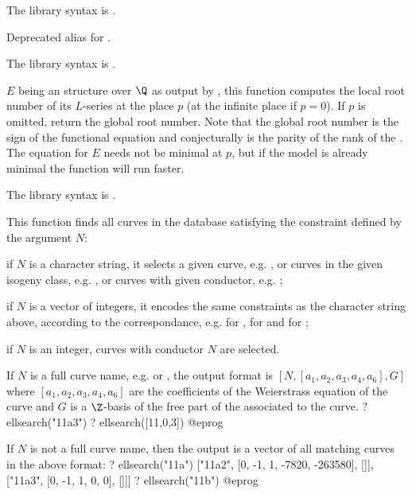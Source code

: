 The library syntax is .

\label{se:ellpow}
Deprecated alias for .

The library syntax is .

\label{se:ellrootno}
$E$ being an  structure over $\Q$ as output by ,
this function computes the local root number of its $L$-series at the place
$p$ (at the infinite place if $p = 0$). If $p$ is omitted, return the global
root number. Note that the global root number is the sign of the functional
equation and conjecturally is the parity of the rank of the . The equation for $E$ needs not be minimal at $p$, but if the model
is already minimal the function will run faster.

The library syntax is .

\label{se:ellsearch}
This function finds all curves in the  database satisfying
the constraint defined by the argument $N$:

\item if $N$ is a character string, it selects a given curve, e.g.
, or curves in the given isogeny class, e.g. , or
curves with given conductor, e.g. ;

\item if $N$ is a vector of integers, it encodes the same constraints
as the character string above, according to the 
correspondance, e.g. \kbd{[11,0,1]} for , \kbd{[11,0]} for
 and \kbd{[11]} for ;

\item if $N$ is an integer, curves with conductor $N$ are selected.

If $N$ is a full curve name, e.g.  or \kbd{[11,0,1]},
the output format is $[N, [a_1,a_2,a_3,a_4,a_6], G]$ where
$[a_1,a_2,a_3,a_4,a_6]$ are the coefficients of the Weierstrass equation of
the curve and $G$ is a $\Z$-basis of the free part of the  associated to the curve.
\bprog
? ellsearch("11a3")
? ellsearch([11,0,3])
@eprog\noindent

If $N$ is not a full curve name, then the output is a vector of all matching
curves in the above format:
\bprog
? ellsearch("11a")
      ["11a2", [0, -1, 1, -7820, -263580], []],
      ["11a3", [0, -1, 1, 0, 0], []]]
? ellsearch("11b")
@eprog

